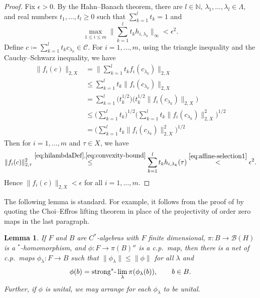 \documentclass[a4paper,11pt]{amsart}
\newtheorem{lemma}[theorem]{Lemma}
\theoremstyle{definition}
\numberwithin{equation}{section}
\numberwithin{theorem}{section}
\begin{document}
\begin{proof}
	Fix $\epsilon > 0$.  By the Hahn--Banach theorem, there are $l\in\mathbb N$, $\lambda_1,\dots,\lambda_l\in\Lambda$, and real numbers  $t_1, \ldots,  t_l \geq 0$ such that $\sum_{k=1}^l t_k = 1$ and
	\begin{equation}\label{eq:affine-selection1}
		\max_{1 \leq i \leq m} \Big\|\sum_{k=1}^l t_k h_{i,\lambda_k}\Big\|_\infty < \epsilon^2.
	\end{equation}
	Define $c \coloneqq \sum_{k=1}^l t_k c_{\lambda_k} \in \mathcal C$.  For $i=1,\ldots,m$, using the triangle inequality and the Cauchy--Schwarz inequality, we have
	\begin{equation}\begin{split}
		\|f_i(c)\|_{2,X} 
		&= \Big\|\sum_{k=1}^l t_k f_i(c_{\lambda_k})\Big\|_{2, X}  \\
		&\leq \sum_{k=1}^l t_k \|f_i(c_{\lambda_k})\|_{2, X}  \\
		&= \sum_{k=1}^l \big(t_k^{1/2})\big( t_k^{1/2} \|f_i(c_{\lambda_k})\|_{2, X}\big)  \\
		&\leq \Big(\sum_{k=1}^l t_k\Big)^{1/2} \Big( \sum_{k=1}^l t_k \|f_i(c_{\lambda_k})\|_{2, X}^2 \Big)^{1/2}  \\
		&= \Big( \sum_{k=1}^l t_k \|f_i(c_{\lambda_k})\|_{2, X}^2 \Big)^{1/2} \label{eq:convexity-bound}
	\end{split}\end{equation}
	Then for $i=1,
	\ldots,m$ and $\tau \in X$, we have
	\begin{equation}
		\|f_i(c)\|_{2, \tau}^2 \stackrel{\eqref{eq:hilambdaDef},\eqref{eq:convexity-bound}}{\leq} \sum_{k=1}^l t_k h_{i,\lambda_k}(\tau) \stackrel{\eqref{eq:affine-selection1}}{<} \epsilon^2.
	\end{equation}
	Hence $\|f_i(c)\|_{2, X} < \epsilon$ for all $i=1,\ldots,m$.
\end{proof}

The following lemma is standard.  For example, it follows from the proof of \cite[Lemma~1.1]{HKW12} by quoting the Choi--Effros lifting theorem in place of the projectivity of order zero maps in the last paragraph.

\begin{lemma}\label{lem:finite-rank-cp}
	If $F$ and $B$ are $C^*$-algebras with $F$ finite dimensional, $\pi \colon B \rightarrow \mathcal B(H)$ is a $^*$-homomorphism, and $\phi \colon F \rightarrow \mathcal \pi(B)''$ is a c.p.\ map, then there is a net of c.p.\ maps $\phi_\lambda \colon F \rightarrow B$ such that $\|\phi_\lambda\| \leq \|\phi\|$ for all $\lambda$ and
	\begin{equation}
		\phi(b) = \text{\rm strong$^*$-}\lim_\lambda \pi(\phi_\lambda(b)), \qquad b \in B.	
	\end{equation}
	Further, if $\phi$ is unital, we may arrange for each $\phi_\lambda$ to be unital.
\end{lemma}
\end{document}
